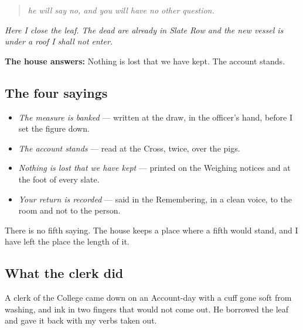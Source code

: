 \documentclass{design/chronicle}
\begin{document}
\begin{quote}\itshape he will say no, and you will have no other question.\end{quote}

\emph{Here I close the leaf. The dead are already in Slate Row and the new vessel is under a roof I shall not enter.}

\textbf{The house answers:} Nothing is lost that we have kept. The account stands.

\subsection*{The four sayings}

\begin{itemize}[leftmargin=1.4em,itemsep=1pt,topsep=3pt,parsep=0pt]

\item \emph{The measure is banked} — written at the draw, in the officer’s hand, before I set the figure down.

\item \emph{The account stands} — read at the Cross, twice, over the pigs.

\item \emph{Nothing is lost that we have kept} — printed on the Weighing notices and at the foot of every slate.

\item \emph{Your return is recorded} — said in the Remembering, in a clean voice, to the room and not to the person.

\end{itemize}

There is no fifth saying. The house keeps a place where a fifth would stand, and I have left the place the length of it.

\subsection*{What the clerk did}

A clerk of the College came down on an Account-day with a cuff gone soft from washing, and ink in two fingers that would not come out. He borrowed the leaf and gave it back with my verbs taken out.
\end{document}
